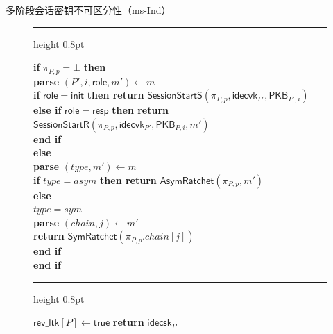 \begin{definition}{多阶段会话密钥不可区分性（ms-Ind）}
\begin{figure}[htbp]
\begin{minipage}[t]{0.48\textwidth}
        \vspace{3mm}
        \hrule height 0.8pt
        \vspace{1mm}

        \textbf{if} $\pi_{P,p} = \bot$ \textbf{then} \\
        \hspace{4mm} \textbf{parse} $(P', i, \mathsf{role}, m') \gets m$ \\
        \hspace{4mm} \textbf{if} $\mathsf{role} = \mathsf{init}$ \textbf{then return} $\mathsf{SessionStartS}(\pi_{P,p}, \mathsf{idecvk}_{P'}, \mathsf{PKB}_{P',i})$ \\
        \hspace{4mm} \textbf{else if} $\mathsf{role} = \mathsf{resp}$ \textbf{then return} $\mathsf{SessionStartR}(\pi_{P,p}, \mathsf{idecvk}_{P'}, \mathsf{PKB}_{P,i}, m')$ \\
        \hspace{4mm} \textbf{end if} \\
        \textbf{else} \\
        \hspace{4mm} \textbf{parse} $(\mathit{type}, m') \gets m$ \\
        \hspace{4mm} \textbf{if} $\mathit{type} = \mathit{asym}$ \textbf{then return} $\mathsf{AsymRatchet}(\pi_{P,p}, m')$ \\
        \hspace{4mm} \textbf{else} \\
        \hspace{8mm} $\mathit{type} = \mathit{sym}$ \\
        \hspace{8mm} \textbf{parse} $(\mathit{chain}, j) \gets m'$ \\
        \hspace{8mm} \textbf{return} $\mathsf{SymRatchet}(\pi_{P,p}.\mathit{chain}[j])$ \\
        \hspace{4mm} \textbf{end if} \\
        \textbf{end if}
    \end{minipage}
    \hfill
    \begin{minipage}[t]{0.48\textwidth}
        \hrule height 0.8pt
        \vspace{1mm}

        $\mathsf{rev\_ltk}[P] \gets \mathsf{true}$ \textbf{ return} $\mathsf{idecsk}_P$


\end{minipage}
\end{figure}
\end{definition}
